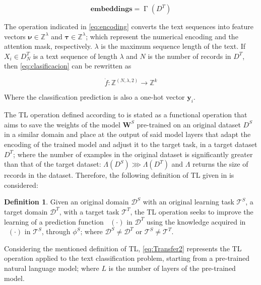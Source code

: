 \documentclass[onecolumn, journal, english, 12pt, a4paper]{IEEEtran} %
\DeclareMathOperator{\ypredtarget}{\phi^{T}}
\DeclareMathOperator{\ypredsource}{\phi^{S}}
\DeclareMathOperator{\Tokenization}{\Gamma}
\theoremstyle{definition}
\newtheorem{definition}{Definition}[section]
\begin{document}
\begin{equation}\label{eq:encoding}
    \mathbf{embeddings} = \Tokenization(D^T)
\end{equation}

The operation indicated in \eqref{eq:encoding} converts the text
sequences into feature vectors
$\boldsymbol{\nu} \in \mathbb{Z}^{\lambda}$ and
$\boldsymbol{\tau} \in \mathbb{Z}^\lambda$; which represent the
numerical encoding and the attention mask, respectively. $\lambda$ is
the maximum sequence length of the text. If $X_i \in D^T_{N}$ is a
text sequence of length $\lambda$ and $N$ is the number of records in
$D^T$, then \eqref{eq:clasificacion} can be rewritten as

\begin{equation}\label{eq: tensorflowin}
    \dot{f}: \mathbb{Z}^{(N,\lambda,2)} \longrightarrow \mathbb{Z}^k
\end{equation}

Where the classification prediction is also a one-hot vector
$\boldsymbol{y}_i$.

The TL operation defined according to \textcite{falconi2020transfer}
is stated as a functional operation that aims to save the weights of
the model $\boldsymbol{W}^S$ pre-trained on an original dataset $D^S$
in a similar domain and place at the output of said model layers that
adapt the encoding of the trained model and adjust it to the target
task, in a target dataset $D^T$; where the number of examples in the
original dataset is significantly greater than that of the target
dataset: $\Lambda(D^S) \ggg \Lambda(D^T)$ and $\Lambda$ returns the
size of records in the dataset. Therefore, the following definition of
TL given in \cite{falconi2020transfer} is considered:

\begin{definition}
  Given an original domain $\mathcal{D}^{S}$ with an original learning
  task $\mathcal{T}^{S}$, a target domain $\mathcal{D}^{T}$, with a
  target task $\mathcal{T}^{T}$, the TL operation seeks to improve the
  learning of a prediction function $\ypredtarget(\cdot)$ in
  $\mathcal{D}^{T}$ using the knowledge acquired in
  $\ypredsource(\cdot)$ in $\mathcal{T}^{S}$, through $\phi^S$; where
  $\mathcal{D}^{S} \neq \mathcal{D}^{T}$ or
  $\mathcal{T}^{S} \neq \mathcal{T}^{T}$.
\end{definition}

Considering the mentioned definition of TL, \eqref{eq:Transfer2}
represents the TL operation applied to the text classification
problem, starting from a pre-trained natural language model; where $L$
is the number of layers of the pre-trained model.
\end{document}
